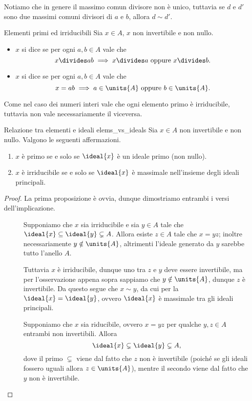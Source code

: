 Notiamo che in genere il massimo comun divisore non è unico, tuttavia se $d$ e $d'$ sono due massimi comuni divisori di $a$ e $b$, allora $d \sim d'$.

\begin{definition}
    {Elementi primi ed irriducibili}{}
    Sia $x \in A$, $x$ non invertibile e non nullo. \begin{itemize}
        \item $x$ si dice  se per ogni $a, b \in A$ vale che \[
            x \divides ab \implies x \divides a \text{ oppure } x \divides b. 
        \]
        \item $x$ si dice  se per ogni $a, b \in A$ vale che \[
            x = ab \implies a \in \units{A} \text{ oppure } b \in \units{A}.    
        \]
    \end{itemize}
\end{definition}

Come nel caso dei numeri interi vale che ogni elemento primo è irriducibile, tuttavia non vale necessariamente il viceversa.

\begin{proposition}
    {Relazione tra elementi e ideali}
    {elems_vs_ideals}
    Sia $x \in A$ non invertibile e non nullo. Valgono le seguenti affermazioni.
    \begin{enumerate}[label={(\roman*)}]
        \item $x$ è primo se e solo se $\ideal{x}$ è un ideale primo (non nullo).
        \item $x$ è irriducibile se e solo se $\ideal{x}$ è massimale nell'insieme degli ideali principali.
    \end{enumerate}
\end{proposition}
\begin{proof}
    La prima proposizione è ovvia, dunque dimostriamo entrambi i versi dell'implicazione.

    \begin{description}
        \item[\boximpl ] Supponiamo che $x$ sia irriducibile e sia $y \in A$ tale che $\ideal{x} \subseteq \ideal{y} \subsetneq A$. Allora esiste $z \in A$ tale che $x = yz$; inoltre necessariamente $y \notin \units{A}$, altrimenti l'ideale generato da $y$ sarebbe tutto l'anello $A$.
        
        Tuttavia $x$ è irriducibile, dunque uno tra $z$ e $y$ deve essere invertibile, ma per l'osservazione appena sopra sappiamo che $y \notin \units{A}$, dunque $z$ è invertibile. Da questo segue che $x \sim y$, da cui per la  $\ideal{x} = \ideal{y}$, ovvero $\ideal{x}$ è massimale tra gli ideali principali.
        \item[\boximplby] Supponiamo che $x$ sia riducibile, ovvero $x = yz$ per qualche $y, z \in A$ entrambi non invertibili. Allora \[
            \ideal{x} \subsetneq \ideal{y} \subsetneq A,    
        \] dove il primo $\subsetneq$ viene dal fatto che $z$ non è invertibile (poiché se gli ideali fossero uguali allora $z \in \units{A}$), mentre il secondo viene dal fatto che $y$ non è invertibile.
    \end{description}
\end{proof}